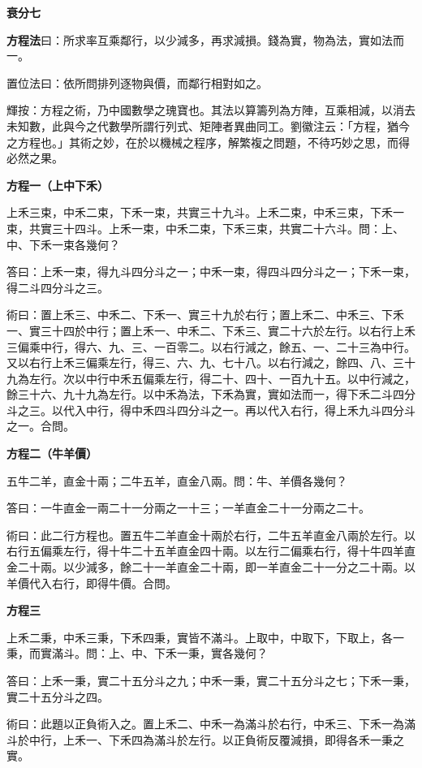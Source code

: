 \documentclass[11pt,a4paper]{article}
\newenvironment{problemenv}[1]{%
  \medskip\noindent\textbf{#1}\par\nopagebreak\smallskip
}{\medskip}
\begin{document}
\begin{problemenv}{衰分七}
\textbf{方程法}曰：所求率互乘鄰行，以少減多，再求減損。錢為實，物為法，實如法而一。

置位法曰：依所問排列逐物與價，而鄰行相對如之。

輝按：方程之術，乃中國數學之瑰寶也。其法以算籌列為方陣，互乘相減，以消去未知數，此與今之代數學所謂行列式、矩陣者異曲同工。劉徽注云：「方程，猶今之方程也。」其術之妙，在於以機械之程序，解繁複之問題，不待巧妙之思，而得必然之果。

\begin{problemenv}{方程一（上中下禾）}
上禾三束，中禾二束，下禾一束，共實三十九斗。上禾二束，中禾三束，下禾一束，共實三十四斗。上禾一束，中禾二束，下禾三束，共實二十六斗。問：上、中、下禾一束各幾何？

\textsf{答曰：}上禾一束，得九斗四分斗之一；中禾一束，得四斗四分斗之一；下禾一束，得二斗四分斗之三。

\textsf{術曰：}置上禾三、中禾二、下禾一、實三十九於右行；置上禾二、中禾三、下禾一、實三十四於中行；置上禾一、中禾二、下禾三、實二十六於左行。以右行上禾三偏乘中行，得六、九、三、一百零二。以右行減之，餘五、一、二十三為中行。又以右行上禾三偏乘左行，得三、六、九、七十八。以右行減之，餘四、八、三十九為左行。次以中行中禾五偏乘左行，得二十、四十、一百九十五。以中行減之，餘三十六、九十九為左行。以中禾為法，下禾為實，實如法而一，得下禾二斗四分斗之三。以代入中行，得中禾四斗四分斗之一。再以代入右行，得上禾九斗四分斗之一。合問。
\end{problemenv}

\begin{problemenv}{方程二（牛羊價）}
五牛二羊，直金十兩；二牛五羊，直金八兩。問：牛、羊價各幾何？

\textsf{答曰：}一牛直金一兩二十一分兩之一十三；一羊直金二十一分兩之二十。

\textsf{術曰：}此二行方程也。置五牛二羊直金十兩於右行，二牛五羊直金八兩於左行。以右行五偏乘左行，得十牛二十五羊直金四十兩。以左行二偏乘右行，得十牛四羊直金二十兩。以少減多，餘二十一羊直金二十兩，即一羊直金二十一分之二十兩。以羊價代入右行，即得牛價。合問。
\end{problemenv}

\begin{problemenv}{方程三}
上禾二秉，中禾三秉，下禾四秉，實皆不滿斗。上取中，中取下，下取上，各一秉，而實滿斗。問：上、中、下禾一秉，實各幾何？

\textsf{答曰：}上禾一秉，實二十五分斗之九；中禾一秉，實二十五分斗之七；下禾一秉，實二十五分斗之四。

\textsf{術曰：}此題以正負術入之。置上禾二、中禾一為滿斗於右行，中禾三、下禾一為滿斗於中行，上禾一、下禾四為滿斗於左行。以正負術反覆減損，即得各禾一秉之實。
\end{problemenv}


\end{problemenv}
\end{document}
